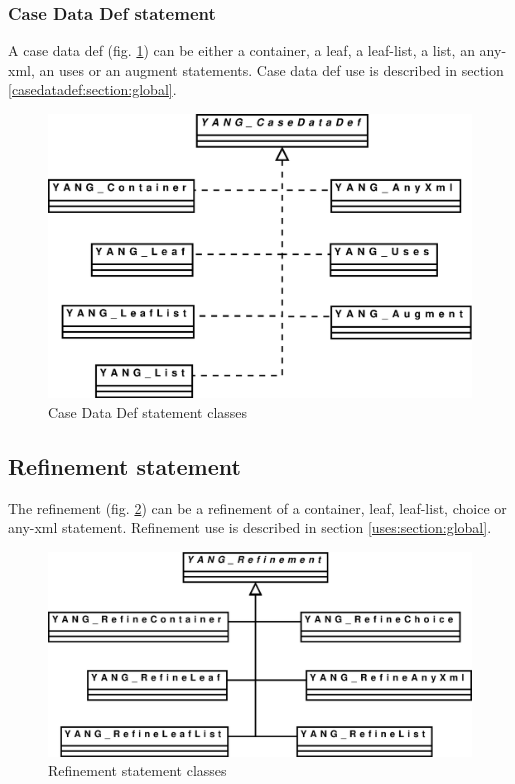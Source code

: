 \documentclass[a4paper]{article}
\begin{document}
\subsubsection{Case Data Def statement}
\label{casedatadef:section:detail}

A case data def (fig.  \ref{casedatadef}) can be either a container, a
leaf,  a  leaf-list,  a  list,  an  any-xml, an  uses  or  an  augment
statements.   Case   data   def    use   is   described   in   section
\ref{casedatadef:section:global}.
\begin{figure}[htbp]
\begin{center}
\includegraphics[scale = .3]{casedatadef.eps}
\end{center}
\caption{Case Data Def  statement classes}
\label{casedatadef}
\end{figure}



\subsection{Refinement statement}
\label{refinement:section:detail}

The  refinement (fig.   \ref{refinement})  can be  a  refinement of  a
container,  leaf, leaf-list, choice  or any-xml  statement. Refinement
use is described in section \ref{uses:section:global}.
\begin{figure}[htbp]
\begin{center}
\includegraphics[scale = .3]{refinement.eps}
\end{center}
\caption{Refinement statement classes}
\label{refinement}
\end{figure}
\end{document}
